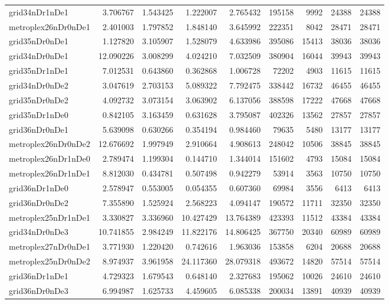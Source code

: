 \begin{longtable}{|l|r|r|r|r|r|r|r|r|}
grid34nDr1nDe1 & 3.706767 & 1.543425 & 1.222007 & 2.765432 & 195158 & 9992 & 24388 & 24388 \\
metroplex26nDr0nDe1 & 2.401003 & 1.797852 & 1.848140 & 3.645992 & 222351 & 8042 & 28471 & 28471 \\
grid35nDr0nDe1 & 1.127820 & 3.105907 & 1.528079 & 4.633986 & 395086 & 15413 & 38036 & 38036 \\
grid34nDr0nDe1 & 12.090226 & 3.008299 & 4.024210 & 7.032509 & 380904 & 16044 & 39943 & 39943 \\
grid35nDr1nDe1 & 7.012531 & 0.643860 & 0.362868 & 1.006728 & 72202 & 4903 & 11615 & 11615 \\
grid34nDr0nDe2 & 3.047619 & 2.703153 & 5.089322 & 7.792475 & 338442 & 16732 & 46455 & 46455 \\
grid35nDr0nDe2 & 4.092732 & 3.073154 & 3.063902 & 6.137056 & 388598 & 17222 & 47668 & 47668 \\
grid35nDr1nDe0 & 0.842105 & 3.163459 & 0.631628 & 3.795087 & 402326 & 13562 & 27857 & 27857 \\
grid36nDr0nDe1 & 5.639098 & 0.630266 & 0.354194 & 0.984460 & 79635 & 5480 & 13177 & 13177 \\
metroplex26nDr0nDe2 & 12.676692 & 1.997949 & 2.910664 & 4.908613 & 248042 & 10506 & 38845 & 38845 \\
metroplex26nDr1nDe0 & 2.789474 & 1.199304 & 0.144710 & 1.344014 & 151602 & 4793 & 15084 & 15084 \\
metroplex26nDr1nDe1 & 8.812030 & 0.434781 & 0.507498 & 0.942279 & 53914 & 3563 & 10750 & 10750 \\
grid36nDr1nDe0 & 2.578947 & 0.553005 & 0.054355 & 0.607360 & 69984 & 3556 & 6413 & 6413 \\
grid36nDr0nDe2 & 7.355890 & 1.525924 & 2.568223 & 4.094147 & 190572 & 11711 & 32350 & 32350 \\
metroplex25nDr1nDe1 & 3.330827 & 3.336960 & 10.427429 & 13.764389 & 423393 & 11512 & 43384 & 43384 \\
grid34nDr0nDe3 & 10.741855 & 2.984249 & 11.822176 & 14.806425 & 367750 & 20340 & 60989 & 60989 \\
metroplex27nDr0nDe1 & 3.771930 & 1.220420 & 0.742616 & 1.963036 & 153858 & 6204 & 20688 & 20688 \\
metroplex25nDr0nDe2 & 8.974937 & 3.961958 & 24.117360 & 28.079318 & 493672 & 14820 & 57514 & 57514 \\
grid36nDr1nDe1 & 4.729323 & 1.679543 & 0.648140 & 2.327683 & 195062 & 10026 & 24610 & 24610 \\
grid36nDr0nDe3 & 6.994987 & 1.625733 & 4.459605 & 6.085338 & 200034 & 13891 & 40939 & 40939 \\

\end{longtable}
